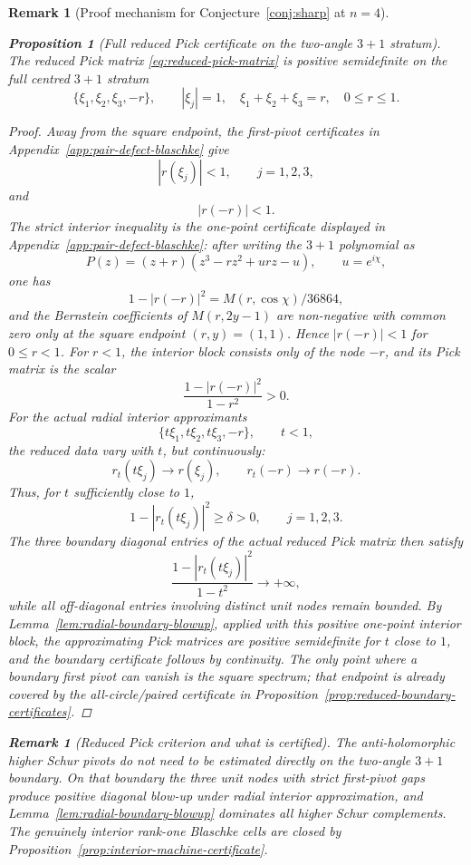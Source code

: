 \documentclass[11pt]{article}
\newtheorem{proposition}[theorem]{Proposition}
\newtheorem{remark}[theorem]{Remark}
\numberwithin{equation}{section}
\begin{document}
\begin{remark}[Proof mechanism for Conjecture~\ref{conj:sharp} at $n=4$]
\begin{proposition}[Full reduced Pick certificate on the two-angle \(3{+}1\) stratum]
\label{prop:full-three-plus-one-reduced-pick}
The reduced Pick matrix \eqref{eq:reduced-pick-matrix} is positive
semidefinite on the full centred \(3{+}1\) stratum
\[
  \{\xi_1,\xi_2,\xi_3,-r\},\qquad
  |\xi_j|=1,\quad \xi_1+\xi_2+\xi_3=r,\quad 0\le r\le1 .
\]
\end{proposition}

\begin{proof}
Away from the square endpoint, the first-pivot certificates in
Appendix~\ref{app:pair-defect-blaschke} give
\[
  |r(\xi_j)|<1,\qquad j=1,2,3,
\]
and
\[
  |r(-r)|<1 .
\]
The strict interior inequality is the one-point certificate displayed in
Appendix~\ref{app:pair-defect-blaschke}: after writing the \(3{+}1\) polynomial
as
\[
  P(z)=(z+r)(z^3-rz^2+ur z-u),\qquad u=e^{i\chi},
\]
one has
\[
  1-|r(-r)|^2=M(r,\cos\chi)/36864,
\]
and the Bernstein coefficients of \(M(r,2y-1)\) are non-negative with common
zero only at the square endpoint \((r,y)=(1,1)\).  Hence
\(|r(-r)|<1\) for \(0\le r<1\).
For \(r<1\), the interior block consists only of the node \(-r\), and its Pick
matrix is the scalar
\[
  \frac{1-|r(-r)|^2}{1-r^2}>0 .
\]
For the actual radial interior approximants
\[
  \{t\xi_1,t\xi_2,t\xi_3,-r\},\qquad t<1,
\]
the reduced data vary with \(t\), but continuously:
\[
  r_t(t\xi_j)\to r(\xi_j),\qquad r_t(-r)\to r(-r).
\]
Thus, for \(t\) sufficiently close to \(1\),
\[
  1-|r_t(t\xi_j)|^2\ge \delta>0,\qquad j=1,2,3 .
\]
The three boundary diagonal entries of the actual reduced Pick matrix then
satisfy
\[
  \frac{1-|r_t(t\xi_j)|^2}{1-t^2}\to+\infty,
\]
while all off-diagonal entries involving distinct unit nodes remain bounded.
By Lemma~\ref{lem:radial-boundary-blowup}, applied with this positive
one-point interior block, the approximating Pick matrices are positive
semidefinite for \(t\) close to \(1\), and the boundary certificate follows by
continuity.  The only point where a boundary first
pivot can vanish is the square spectrum; that endpoint is already covered by
the all-circle/paired certificate in
Proposition~\ref{prop:reduced-boundary-certificates}.
\end{proof}

\begin{remark}[Reduced Pick criterion and what is certified]
\label{rem:reduced-pick-certified-scope}
The anti-holomorphic higher Schur pivots do not need to be estimated directly
on the two-angle \(3{+}1\) boundary.  On that boundary the three unit nodes
with strict first-pivot gaps produce positive diagonal blow-up under radial
interior approximation, and Lemma~\ref{lem:radial-boundary-blowup} dominates
all higher Schur complements.  The genuinely interior rank-one Blaschke cells
are closed by Proposition~\ref{prop:interior-machine-certificate}.
\end{remark}


\end{remark}
\end{document}

